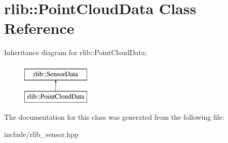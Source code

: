\hypertarget{classrlib_1_1PointCloudData}{\section{rlib\-:\-:Point\-Cloud\-Data Class Reference}
\label{classrlib_1_1PointCloudData}
}
Inheritance diagram for rlib\-:\-:Point\-Cloud\-Data\-:\begin{figure}[H]
\begin{center}
\leavevmode
\includegraphics[height=2.000000cm]{classrlib_1_1PointCloudData}
\end{center}
\end{figure}


The documentation for this class was generated from the following file\-:\begin{DoxyCompactItemize}
\item 
include/rlib\-\_\-sensor.\-hpp\end{DoxyCompactItemize}
